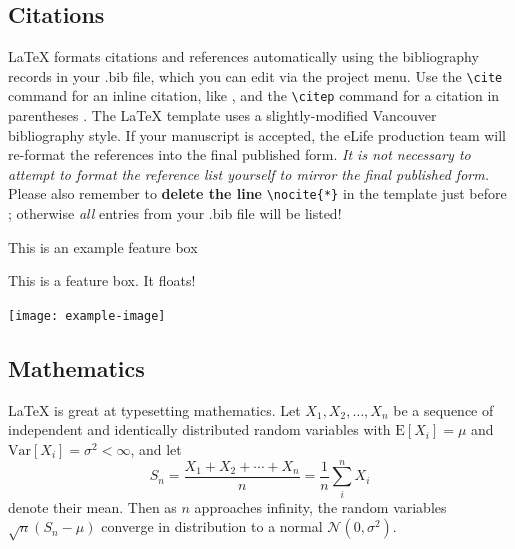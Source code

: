 \documentclass[9pt,lineno]{elife}
\begin{document}
\subsection{Citations}

LaTeX formats citations and references automatically using the bibliography records in your .bib file, which you can edit via the project menu. Use the \verb|\cite| command for an inline citation, like \cite{Aivazian917}, and the \verb|\citep| command for a citation in parentheses \citep{Aivazian917}. The LaTeX template uses a slightly-modified Vancouver bibliography style. If your manuscript is accepted, the eLife production team will re-format the references into the final published form. \emph{It is not necessary to attempt to format the reference list yourself to mirror the final published form.} Please also remember to \textbf{delete the line} \verb|\nocite{*}| in the template just before \verb||; otherwise \emph{all} entries from your .bib file will be listed! 

\begin{featurebox}
\caption{This is an example feature box}
\label{box:simple}
This is a feature box. It floats!
\medskip

\texttt{[image: example-image]}

\lipsum[1]
\end{featurebox}

\subsection{Mathematics}

\LaTeX{} is great at typesetting mathematics. Let $X_1, X_2, \ldots, X_n$ be a sequence of independent and identically distributed random variables with $\text{E}[X_i] = \mu$ and $\text{Var}[X_i] = \sigma^2 < \infty$, and let
\begin{equation}
\label{eq:CLT}
S_n = \frac{X_1 + X_2 + \cdots + X_n}{n}
      = \frac{1}{n}\sum_{i}^{n} X_i
\end{equation}
denote their mean. Then as $n$ approaches infinity, the random variables $\sqrt{n}(S_n - \mu)$ converge in distribution to a normal $\mathcal{N}(0, \sigma^2)$.

\lipsum[3] 
\end{document}
